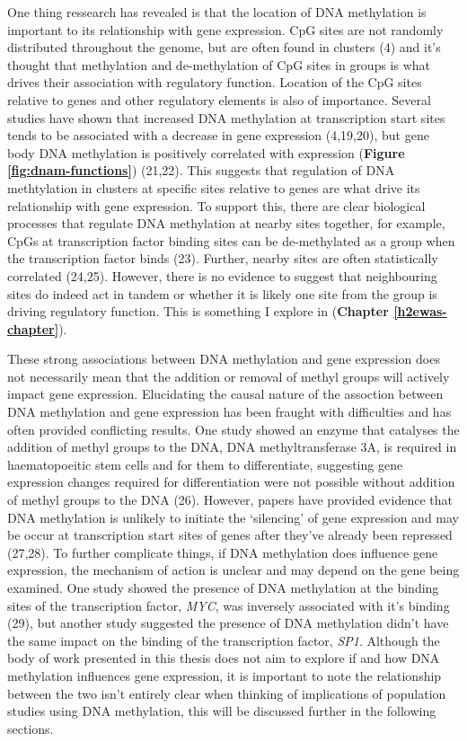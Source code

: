 \documentclass[11pt,twoside]{bristolthesis}
\begin{document}
One thing ressearch has revealed is that the location of DNA methylation is important to its relationship with gene expression. CpG sites are not randomly distributed throughout the genome, but are often found in clusters (4) and it's thought that methylation and de-methylation of CpG sites in groups is what drives their association with regulatory function. Location of the CpG sites relative to genes and other regulatory elements is also of importance. Several studies have shown that increased DNA methylation at transcription start sites tends to be associated with a decrease in gene expression (4,19,20), but gene body DNA methylation is positively correlated with expression (\textbf{Figure \ref{fig:dnam-functions}}) (21,22). This suggests that regulation of DNA methtylation in clusters at specific sites relative to genes are what drive its relationship with gene expression. To support this, there are clear biological processes that regulate DNA methylation at nearby sites together, for example, CpGs at transcription factor binding sites can be de-methylated as a group when the transcription factor binds (23). Further, nearby sites are often statistically correlated (24,25). However, there is no evidence to suggest that neighbouring sites do indeed act in tandem or whether it is likely one site from the group is driving regulatory function. This is something I explore in (\textbf{Chapter \ref{h2ewas-chapter}}).

These strong associations between DNA methylation and gene expression does not necessarily mean that the addition or removal of methyl groups will actively impact gene expression. Elucidating the causal nature of the assoction between DNA methylation and gene expression has been fraught with difficulties and has often provided conflicting results. One study showed an enzyme that catalyses the addition of methyl groups to the DNA, DNA methyltransferase 3A, is required in haematopoeitic stem cells and for them to differentiate, suggesting gene expression changes required for differentiation were not possible without addition of methyl groups to the DNA (26). However, papers have provided evidence that DNA methylation is unlikely to initiate the `silencing' of gene expression and may be occur at transcription start sites of genes after they've already been repressed (27,28). To further complicate things, if DNA methylation does influence gene expression, the mechanism of action is unclear and may depend on the gene being examined. One study showed the presence of DNA methylation at the binding sites of the transcription factor, \emph{MYC}, was inversely associated with it's binding (29), but another study suggested the presence of DNA methylation didn't have the same impact on the binding of the transcription factor, \emph{SP1}. Although the body of work presented in this thesis does not aim to explore if and how DNA methylation influences gene expression, it is important to note the relationship between the two isn't entirely clear when thinking of implications of population studies using DNA methylation, this will be discussed further in the following sections.
\end{document}
